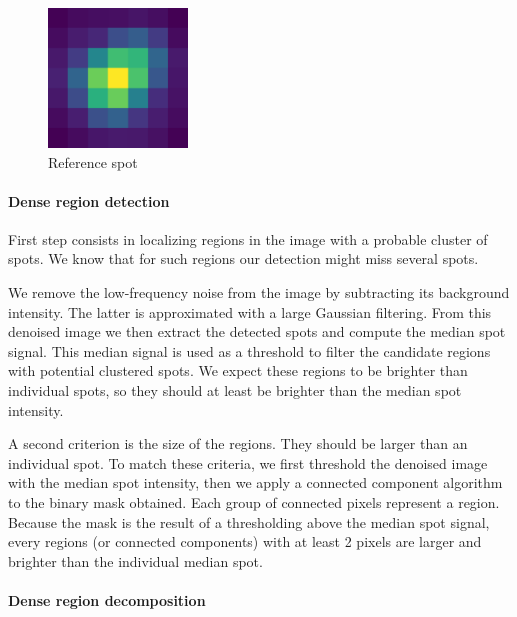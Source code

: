 \begin{figure}
  \begin{center}
    \includegraphics[width=0.33\textwidth]{figures/chapter2/reference_spot}
  \end{center}
  \caption{Reference spot}
  \label{fig:reference_spot}
\end{figure}

\paragraph{Dense region detection}

First step consists in localizing regions in the image with a probable cluster of spots.
We know that for such regions our detection might miss several spots.

We remove the low-frequency noise from the image by subtracting its background intensity.
The latter is approximated with a large Gaussian filtering.
From this denoised image we then extract the detected spots and compute the median spot signal.
This median signal is used as a threshold to filter the candidate regions with potential clustered spots.
We expect these regions to be brighter than individual spots, so they should at least be brighter than the median spot intensity.

A second criterion is the size of the regions.
They should be larger than an individual spot.
To match these criteria, we first threshold the denoised image with the median spot intensity, then we apply a connected component algorithm\cite{wu_connected_component_2005} to the binary mask obtained.
Each group of connected pixels represent a region.
Because the mask is the result of a thresholding above the median spot signal, every regions (or connected components) with at least 2 pixels are larger and brighter than the individual median spot.

\paragraph{Dense region decomposition}

